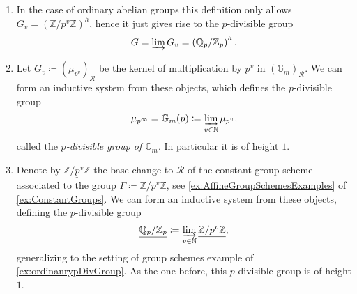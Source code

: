 \begin{ex}\leavevmode\vspace{-.2\baselineskip}\label{ex:pDivGroups}
\begin{enumerate}
\item In the case of ordinary abelian groups this definition\label{ex:ordinanrypDivGroup}
	only allows
	$G_v = \left( \mathbb{Z}/p^v\mathbb{Z} \right)^h$, hence
	it just gives rise to the $p$-divisible group
	\begin{equation*}
		G = \varinjlim G_v = \left( \mathbb{Q}_p / \mathbb{Z}_p \right)^h
	.\end{equation*} 

\item Let $G_v \coloneqq (\mu_{p^v})_{\mathscr{R}}$ be the kernel of
	multiplication by $p^v$ in $(\mathbb{G}_m)_{\mathscr{R}}$.
	We can form an inductive system from these objects, which defines
	the $p$-divisible group
	\begin{equation*}
		\mu_{p^\infty} = \mathbb{G}_m(p) \coloneqq \varinjlim_{v \in \mathbb{N}}
		\mu_{p^v}
	,\end{equation*}
	called the \emph{$p$-divisible group of $\mathbb{G}_m$}.
	In particular it is of height $1$.

\item Denote by $\underline{\mathbb{Z}/p^v\mathbb{Z}}$ the base change to $\mathscr{R}$\label{ex:Qp/Zp}
	of the constant group scheme associated
	to the group $\Gamma \coloneqq \mathbb{Z}/p^v\mathbb{Z}$, see 
	\cref{ex:AffineGroupSchemesExamples} of
	\cref{ex:ConstantGroups}.
	We can form an inductive system from these objects, defining the $p$-divisible group
	\begin{equation*}
	\underline{\mathbb{Q}_p/\mathbb{Z}_{p}} \coloneqq \varinjlim_{v \in \mathbb{N}}
	\underline{\mathbb{Z}/p^v\mathbb{Z}}
	,\end{equation*}
	generalizing to the setting of group schemes example of \cref{ex:ordinanrypDivGroup}.
	As the one before, this $p$-divisible group is of height $1$.
	

\end{enumerate}
\end{ex}
